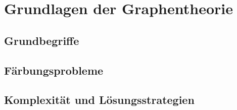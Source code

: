 
\newpage
\section{Grundlagen der Graphentheorie}
\subsection{Grundbegriffe}
\subsection{Färbungsprobleme}
\subsection{Komplexität und Lösungsstrategien}




